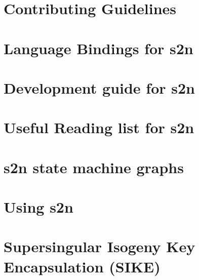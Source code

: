 \documentclass[twoside]{book}
\newcommand{\+}{\discretionary{\mbox{\scriptsize$\hookleftarrow$}}{}{}}
\begin{document}
\chapter{Contributing Guidelines}
\label{md_crt_aws_crt_cpp_crt_aws_c_mqtt__c_o_n_t_r_i_b_u_t_i_n_g}

\chapter{Language Bindings for s2n}
\label{md_crt_aws_crt_cpp_crt_s2n_docs__b_i_n_d_i_n_g_s}

\chapter{Development guide for s2n}
\label{md_crt_aws_crt_cpp_crt_s2n_docs__d_e_v_e_l_o_p_m_e_n_t__g_u_i_d_e}

\chapter{Useful Reading list for s2n}
\label{md_crt_aws_crt_cpp_crt_s2n_docs__r_e_a_d_i_n_g__l_i_s_t}

\chapter{s2n state machine graphs}
\label{md_crt_aws_crt_cpp_crt_s2n_docs__s_t_a_t_e__m_a_c_h_i_n_e}

\chapter{Using s2n}
\label{md_crt_aws_crt_cpp_crt_s2n_docs__u_s_a_g_e__g_u_i_d_e}

\chapter{Supersingular Isogeny Key Encapsulation (SIKE)}
\label{md_crt_aws_crt_cpp_crt_s2n_pq_crypto_sike_r1__readme}

\end{document}
